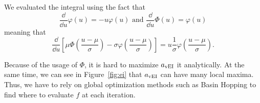 We evaluated the integral using the fact that
\begin{equation*}
    \frac{ \dd }{ \dd u } \varphi(u) = - u\varphi(u)
    \text{  and  }
    \frac{ \dd }{ \dd u } \Phi(u) = \varphi(u)
\end{equation*}
meaning that
\begin{equation*}
    \frac{ \dd }{ \dd u }
    \left[
        \mu \Phi\left(\frac{ u - \mu }{ \sigma }\right) - \sigma \varphi\left(\frac{ u - \mu }{ \sigma }\right)
        \right]
    = u \frac{ 1 }{ \sigma } \varphi\left( \frac{ u - \mu }{\sigma}\right).
\end{equation*}

Because of the usage of $\Phi$, it is hard to maximize $a_{\mathrm{vEI}}$ it analytically.
At the same time, we can see in Figure~\ref{fig:ei} that $a_{\mathrm{vEI}}$ can have many local maxima.
Thus, we have to rely on global optimization methods such as Basin Hopping \cite{wales1997} to find where to evaluate $f$ at each iteration.
